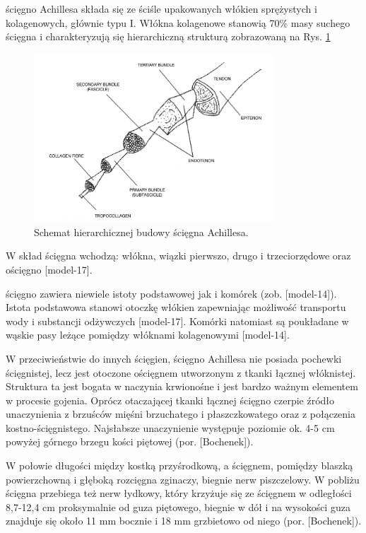 ścięgno Achillesa składa się ze ściśle upakowanych włókien sprężystych i kolagenowych, głównie typu I.  Włókna kolagenowe stanowią 70\% masy suchego ścięgna i charakteryzują się hierarchiczną strukturą zobrazowaną na Rys. \ref{Achilles-histology}  
\begin{figure}[h!]
	\centering
	\includegraphics[width=0.8\textwidth]{figures/Achilles_hist.png}
	\caption{Schemat hierarchicznej budowy ścięgna Achillesa.}
	\label{Achilles-histology}
\end{figure}
W skład ścięgna wchodzą: włókna, wiązki pierwszo, drugo i trzeciorzędowe oraz ościęgno [model-17]. 

ścięgno zawiera niewiele istoty podstawowej jak i komórek (zob. [model-14]). Istota podstawowa stanowi otoczkę włókien zapewniając możliwość transportu wody i substancji odżywczych [model-17]. Komórki natomiast są poukładane w wąskie pasy leżące pomiędzy włóknami kolagenowymi [model-14]. 

W przeciwieństwie do innych ścięgien, ścięgno Achillesa nie posiada pochewki ścięgnistej, lecz jest otoczone ościęgnem utworzonym z tkanki łącznej włóknistej. Struktura ta jest bogata w naczynia krwionośne i jest bardzo ważnym elementem w procesie gojenia. Oprócz otaczającej tkanki łącznej ścięgno czerpie źródło unaczynienia z brzuśców mięśni brzuchatego i płaszczkowatego oraz z połączenia kostno-ścięgnistego. Najsłabsze unaczynienie występuje poziomie ok. 4-5 cm powyżej górnego brzegu kości piętowej (por. [Bochenek]).

W połowie długości między kostką przyśrodkową, a ścięgnem, pomiędzy blaszką powierzchowną i głęboką rozcięgna zginaczy, biegnie nerw piszczelowy. W pobliżu ścięgna przebiega też nerw łydkowy, który krzyżuje się ze ścięgnem w odległości 8,7-12,4 cm proksymalnie od guza piętowego, biegnie w dół i na wysokości guza znajduje się około 11 mm bocznie i 18 mm grzbietowo od niego (por. [Bochenek]). 


